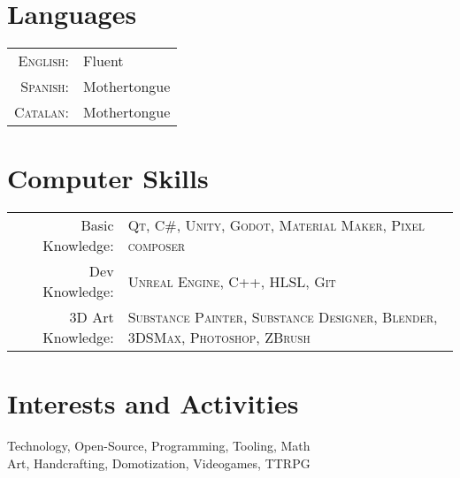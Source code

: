 \documentclass[a4paper,10pt]{article} %
\begin{document}

\section{Languages}

\begin{tabular}{rl}
\textsc{English:} & Fluent\\

\textsc{Spanish:} & Mothertongue\\

\textsc{Catalan:} & Mothertongue\\
\end{tabular}


\section{Computer Skills}

\begin{tabular}{rl}
Basic Knowledge: & \textsc{Qt}, \textsc{C\#}, \textsc{Unity}, \textsc{Godot}, \textsc{Material Maker}, \textsc{Pixel composer}\\

Dev Knowledge: & \textsc{Unreal Engine}, \textsc{C++}, \textsc{HLSL}, \textsc{Git}\\
3D Art Knowledge: & \textsc{Substance Painter}, \textsc{Substance Designer}, \textsc{Blender}, \textsc{3DSMax}, \textsc{Photoshop}, \textsc{ZBrush}\\
\end{tabular}


\section{Interests and Activities}

Technology, Open-Source, Programming, Tooling, Math\\
Art, Handcrafting, Domotization, Videogames, TTRPG
\end{document}
